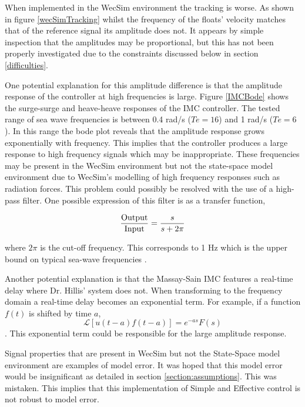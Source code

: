 \documentclass{report}
\begin{document}
When implemented in the WecSim environment the tracking is worse. As shown in figure \ref{wecSimTracking} whilst the frequency of the floats' velocity matches that of the reference signal its amplitude does not. It appears by simple inspection that the amplitudes may be proportional, but this has not been properly investigated due to the constraints discussed below in section \ref{difficulties}.

One potential explanation for this amplitude difference is that the amplitude response of the controller at high frequencies is large. Figure \ref{IMCBode} shows the surge-surge and heave-heave responses of the IMC controller. The tested range of sea wave frequencies is between 0.4 rad/s ($Te = 16$) and 1 rad/s ($Te=6$). In this range the bode plot reveals that the amplitude response grows exponentially with frequency. This implies that the controller produces a large response to high frequency signals which may be inappropriate. These frequencies may be present in the WecSim environment but not the state-space model environment due to WecSim's modelling of high frequency responses such as radiation forces. This problem could possibly be resolved with the use of a high-pass filter. One possible expression of this filter is as a transfer function,

\[
\frac{\textup{Output}}{\textup{Input}}=\frac{s}{s+2\pi}
\]

where $2\pi$ is the cut-off frequency. This corresponds to 1 Hz which is the upper bound on typical sea-wave frequencies \cite{PMReview}.

Another potential explanation is that the Massay-Sain IMC features a real-time delay where Dr. Hillis' system does not. When transforming to the frequency domain a real-time delay becomes an exponential term. For example, if a function $f(t)$ is shifted by time $a$,
\[
\mathcal{L}[u(t-a)f(t-a)]=e^{-as}F(s)
\].
This exponential term could be responsible for the large amplitude response.

Signal properties that are present in WecSim but not the State-Space model environment are examples of model error.  It was hoped that this model error would be insignificant as detailed in section \ref{section:assumptions}. This was mistaken. This implies that this implementation of Simple and Effective control is not robust to model error.
\end{document}
